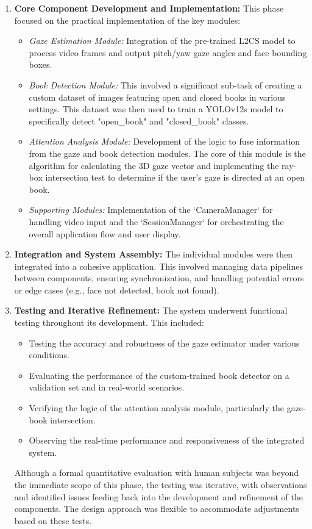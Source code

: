 \begin{enumerate}
    \item \textbf{Core Component Development and Implementation:}
    This phase focused on the practical implementation of the key modules:
    \begin{itemize}
        \item \textit{Gaze Estimation Module:} Integration of the pre-trained L2CS model to process video frames and output pitch/yaw gaze angles and face bounding boxes.
        \item \textit{Book Detection Module:} This involved a significant sub-task of creating a custom dataset of images featuring open and closed books in various settings. This dataset was then used to train a YOLOv12s model to specifically detect "open\_book" and "closed\_book" classes.
        \item \textit{Attention Analysis Module:} Development of the logic to fuse information from the gaze and book detection modules. The core of this module is the algorithm for calculating the 3D gaze vector and implementing the ray-box intersection test to determine if the user's gaze is directed at an open book.
        \item \textit{Supporting Modules:} Implementation of the `CameraManager` for handling video input and the `SessionManager` for orchestrating the overall application flow and user display.
    \end{itemize}

    \item \textbf{Integration and System Assembly:}
    The individual modules were then integrated into a cohesive application. This involved managing data pipelines between components, ensuring synchronization, and handling potential errors or edge cases (e.g., face not detected, book not found).

    \item \textbf{Testing and Iterative Refinement:}
    The system underwent functional testing throughout its development. This included:
    \begin{itemize}
        \item Testing the accuracy and robustness of the gaze estimator under various conditions.
        \item Evaluating the performance of the custom-trained book detector on a validation set and in real-world scenarios.
        \item Verifying the logic of the attention analysis module, particularly the gaze-book intersection.
        \item Observing the real-time performance and responsiveness of the integrated system.
    \end{itemize}
    Although a formal quantitative evaluation with human subjects was beyond the immediate scope of this phase, the testing was iterative, with observations and identified issues feeding back into the development and refinement of the components. The design approach was flexible to accommodate adjustments based on these tests.
\end{enumerate}

